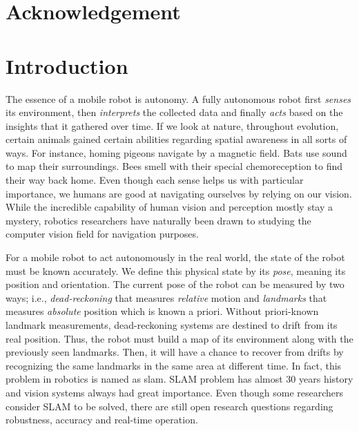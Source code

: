 \documentclass[a4paper]{report}
\numberwithin{figure}{section}
\begin{document}
\newpage



\tableofcontents
\cleardoublepage
\setcounter{page}{1}
\listoffigures
{}
\listoftables
{}
\newpage
\printnoidxglossary[type=acronym,title={List of Abbreviations}]
\printnoidxglossary[title=List of Notations,sort=def]
\glsaddallunused
\printacronyms
\chapter*{Acknowledgement}
\newpage


\chapter{Introduction} \label{cp_intro}

The essence of a mobile robot is autonomy. 
A fully autonomous robot first \textit{senses} its environment, then 
\textit{interprets} the collected data and finally \textit{acts} based on the insights 
that it gathered over time.
If we look at nature, throughout evolution, 
certain animals gained certain abilities regarding 
spatial awareness in all sorts of ways. For instance, 
homing pigeons navigate by a magnetic field. Bats use sound to map their 
surroundings. Bees smell with their special chemoreception to find their way 
back home. 
Even though each sense helps us with particular importance,
we humans are good at navigating ourselves by relying on our vision. 
While the incredible capability of human vision and perception 
mostly stay a mystery, 
robotics researchers have naturally been drawn to studying 
the computer vision field for navigation purposes.


For a mobile robot to act autonomously in the real world, the state of the
robot must be known accurately. We define this physical state by its
\textit{pose}, meaning its position and orientation. The current pose of the
robot can be measured by two ways; i.e., \textit{dead-reckoning} that measures
\textit{relative} motion and \textit{landmarks} that measures \textit{absolute}
position which is known a priori.  Without priori-known landmark measurements,
dead-reckoning systems are destined to drift from its real position. Thus, the
robot must build a map of its environment along with the previously seen
landmarks. Then, it will have a chance to recover from drifts by recognizing
the same landmarks in the same area at different time. In fact, this problem in
robotics is named as \acrfull{slam}. SLAM problem has almost 30 years history
\parencite{Moravec1980} and vision systems always had great importance. Even 
though
some researchers \parencite{Frese2010} consider SLAM to be solved, there are 
still
open research questions regarding robustness, accuracy and real-time operation.
\end{document}
